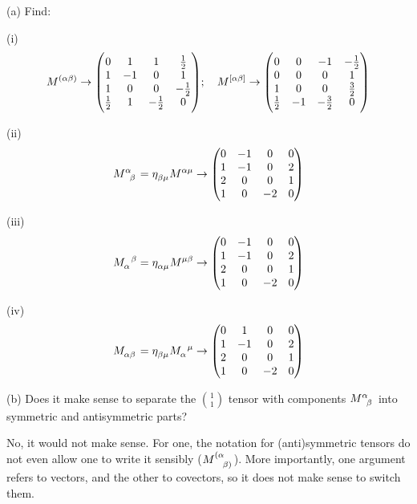 \documentclass[gr-notes.tex]{subfiles}
\begin{document}
(a)
Find:

(i)
\begin{displaymath}
  M^{(\alpha\beta)} \to
  \mqty(
    0 & 1 & 1 & \frac{1}{2} \\
    1 & -1 & 0 & 1 \\
    1 & 0 & 0 & -\frac{1}{2} \\
    \frac{1}{2} & 1 & -\frac{1}{2} & 0
  );
  \quad
  M^{[\alpha\beta]} \to
  \mqty(
    0 & 0 & -1 & -\frac{1}{2} \\
    0 & 0 & 0 & 1 \\
    1 & 0 & 0 & \frac{3}{2} \\
    \frac{1}{2} & -1 & -\frac{3}{2} & 0
  )
\end{displaymath}


(ii)
\begin{displaymath}
  \tensor{M}{^\alpha_\beta} =
  \tensor{\eta}{_{\beta\mu}} \tensor{M}{^{\alpha\mu}} \to
  \mqty(
    0 & -1 & 0 & 0 \\
    1 & -1 & 0 & 2 \\
    2 & 0 & 0 & 1 \\
    1 & 0 & -2 & 0
  )
\end{displaymath}


(iii)
\begin{displaymath}
  \tensor{M}{_\alpha^\beta} =
  \tensor{\eta}{_{\alpha\mu}} \tensor{M}{^{\mu\beta}} \to
  \mqty(
    0 & -1 & 0 & 0 \\
    1 & -1 & 0 & 2 \\
    2 & 0 & 0 & 1 \\
    1 & 0 & -2 & 0
  )
\end{displaymath}


(iv)
\begin{displaymath}
  \tensor{M}{_{\alpha\beta}} =
  \tensor{\eta}{_{\beta\mu}} \tensor{M}{_\alpha^\mu} \to
  \mqty(
     0 &  1 &  0 &  0 \\
     1 & -1 &  0 &  2 \\
     2 &  0 &  0 &  1 \\
     1 &  0 & -2 &  0
  )
\end{displaymath}

(b) Does it make sense to separate the $\binom{1}{1}$ tensor with components $\tensor{M}{^\alpha_\beta}$ into symmetric and antisymmetric parts?

No, it would not make sense. For one, the notation for (anti)symmetric tensors do not even allow one to write it sensibly ($\tensor{M}{^{(\alpha}_{\beta)}}$). More importantly, one argument refers to vectors, and the other to covectors, so it does not make sense to switch them.
\end{document}
